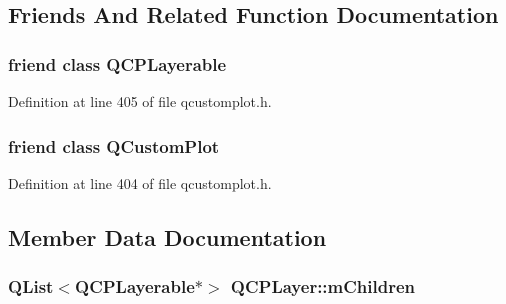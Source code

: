 \subsection{Friends And Related Function Documentation}
\hypertarget{class_q_c_p_layer_ad655f55cccf49ba14d5172ec517e07ae}{}
\subsubsection[{Q\+C\+P\+Layerable}]{\setlength{\rightskip}{0pt plus 5cm}friend class {\bf Q\+C\+P\+Layerable}\hspace{0.3cm}{\ttfamily [friend]}}\label{class_q_c_p_layer_ad655f55cccf49ba14d5172ec517e07ae}


Definition at line 405 of file qcustomplot.\+h.

\hypertarget{class_q_c_p_layer_a1cdf9df76adcfae45261690aa0ca2198}{}
\subsubsection[{Q\+Custom\+Plot}]{\setlength{\rightskip}{0pt plus 5cm}friend class {\bf Q\+Custom\+Plot}\hspace{0.3cm}{\ttfamily [friend]}}\label{class_q_c_p_layer_a1cdf9df76adcfae45261690aa0ca2198}


Definition at line 404 of file qcustomplot.\+h.



\subsection{Member Data Documentation}
\hypertarget{class_q_c_p_layer_a704aa71bba469383c3a3c598c1ec0d28}{}
\subsubsection[{m\+Children}]{\setlength{\rightskip}{0pt plus 5cm}Q\+List$<${\bf Q\+C\+P\+Layerable}$\ast$$>$ Q\+C\+P\+Layer\+::m\+Children\hspace{0.3cm}{\ttfamily [protected]}}\label{class_q_c_p_layer_a704aa71bba469383c3a3c598c1ec0d28}


